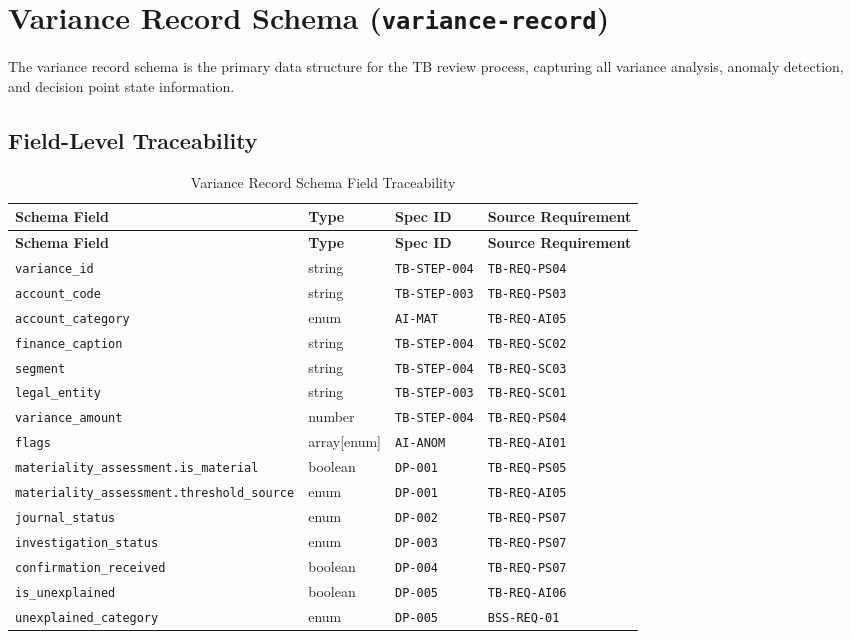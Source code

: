 \documentclass[11pt,a4paper,twoside]{report}
\newcommand{\reqref}[1]{\texttt{#1}}
\newcommand{\specref}[1]{\texttt{#1}}
\newcommand{\schemaref}[1]{\texttt{#1}}
\newcommand{\fieldref}[1]{\textcolor{sapblue}{\texttt{#1}}}
\begin{document}
\section{Variance Record Schema (\schemaref{variance-record})}
\label{sec:variance-record-schema}

The variance record schema is the primary data structure for the TB
review process, capturing all variance analysis, anomaly detection,
and decision point state information.

\subsection{Field-Level Traceability}

\begin{longtable}{@{}L{4cm}L{2.5cm}C{2cm}L{4.5cm}@{}}
\caption{Variance Record Schema Field Traceability}
\label{tab:variance-record-fields} \\
\toprule
\textbf{Schema Field} & \textbf{Type} & \textbf{Spec ID} & \textbf{Source Requirement} \\
\midrule
\endfirsthead
\toprule
\textbf{Schema Field} & \textbf{Type} & \textbf{Spec ID} & \textbf{Source Requirement} \\
\midrule
\endhead
\fieldref{variance\_id} & string & \specref{TB-STEP-004} & \reqref{TB-REQ-PS04} \\
\fieldref{account\_code} & string & \specref{TB-STEP-003} & \reqref{TB-REQ-PS03} \\
\fieldref{account\_category} & enum & \specref{AI-MAT} & \reqref{TB-REQ-AI05} \\
\fieldref{finance\_caption} & string & \specref{TB-STEP-004} & \reqref{TB-REQ-SC02} \\
\fieldref{segment} & string & \specref{TB-STEP-004} & \reqref{TB-REQ-SC03} \\
\fieldref{legal\_entity} & string & \specref{TB-STEP-003} & \reqref{TB-REQ-SC01} \\
\fieldref{variance\_amount} & number & \specref{TB-STEP-004} & \reqref{TB-REQ-PS04} \\
\fieldref{flags} & array[enum] & \specref{AI-ANOM} & \reqref{TB-REQ-AI01} \\
\fieldref{materiality\_assessment.is\_material} & boolean & \specref{DP-001} & \reqref{TB-REQ-PS05} \\
\fieldref{materiality\_assessment.threshold\_source} & enum & \specref{DP-001} & \reqref{TB-REQ-AI05} \\
\fieldref{journal\_status} & enum & \specref{DP-002} & \reqref{TB-REQ-PS07} \\
\fieldref{investigation\_status} & enum & \specref{DP-003} & \reqref{TB-REQ-PS07} \\
\fieldref{confirmation\_received} & boolean & \specref{DP-004} & \reqref{TB-REQ-PS07} \\
\fieldref{is\_unexplained} & boolean & \specref{DP-005} & \reqref{TB-REQ-AI06} \\
\fieldref{unexplained\_category} & enum & \specref{DP-005} & \reqref{BSS-REQ-01} \\
\bottomrule
\end{longtable}
\end{document}
